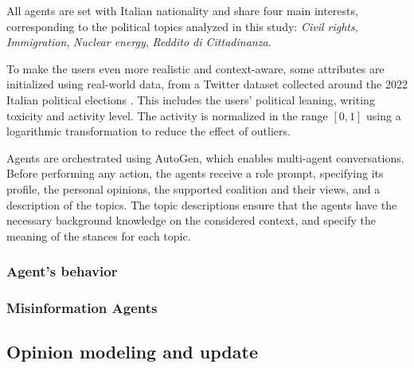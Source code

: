 All agents are set with Italian nationality and share four main interests, corresponding to the political topics analyzed in this study: \textit{Civil rights}, \textit{Immigration}, \textit{Nuclear energy}, \textit{Reddito di Cittadinanza}.

To make the users even more realistic and context-aware, some attributes are initialized using real-world data, from a Twitter dataset collected around the 2022 Italian political elections \cite{pierri2023ita}.
This includes the users' political leaning, writing toxicity and activity level.
The activity is normalized in the range $[0,1]$ using a logarithmic transformation to reduce the effect of outliers.

Agents are orchestrated using AutoGen, which enables multi-agent conversations.
Before performing any action, the agents receive a role prompt, specifying its profile, the personal opinions, the supported coalition and their views, and a description of the topics.
The topic descriptions ensure that the agents have the necessary background knowledge on the considered context, and specify the meaning of the stances for each topic.


\subsubsection{Agent's behavior}

\subsubsection{Misinformation Agents}


\subsection{Opinion modeling and update}